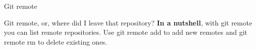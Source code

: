 \begin{frame}{Git remote}
    \begin{block}{Git remote, or, where did I leave that repository?}
    \textbf{In a nutshell}, with git remote you can list remote repositories. Use git remote add to add new remotes and git remote rm to delete existing ones.
    
    \end{block}
\end{frame}
